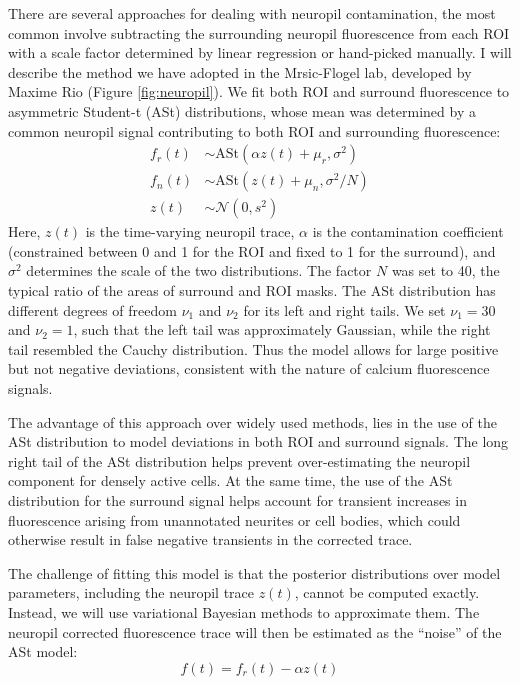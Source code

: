 \documentclass[a4paper]{report}
\begin{document}
There are several approaches for dealing with neuropil contamination, the most common involve subtracting the surrounding neuropil fluorescence from each ROI with a scale factor determined by linear regression or hand-picked manually. I will describe the method we have adopted in the Mrsic-Flogel lab, developed by Maxime Rio (Figure \ref{fig:neuropil}). 
We fit both ROI and surround fluorescence to asymmetric Student-t (ASt) distributions, whose mean was determined by a common neuropil signal contributing to both ROI and surrounding fluorescence:
\begin{align}
	f_r(t) &\sim \mathrm{ASt}(\alpha z(t) + \mu_r, \sigma^2) \\
	f_n(t) &\sim \mathrm{ASt}(z(t) + \mu_n, \sigma^2 / N) \label{eq:ast_n}\\
	z(t) &\sim \mathcal{N}(0, s^2)
\end{align}
Here, $z(t)$ is the time-varying neuropil trace, $\alpha$ is the contamination coefficient (constrained between 0 and 1 for the ROI and fixed to 1 for the surround), and $\sigma^2$ determines the scale of the two distributions. 
The factor $N$ was set to 40, the typical ratio of the areas of surround and ROI masks. 
The ASt distribution has different degrees of freedom $\nu_1$ and $\nu_2$ for its left and right tails. 
We set $\nu_1=30$ and $\nu_2=1$, such that the left tail was approximately Gaussian, while the right tail resembled the Cauchy distribution. 
Thus the model allows for large positive but not negative deviations, consistent with the nature of calcium fluorescence signals.

The advantage of this approach over widely used methods, lies in the use of the ASt distribution to model deviations in both ROI and surround signals. 
The long right tail of the ASt distribution helps prevent over-estimating the neuropil component for densely active cells. 
At the same time, the use of the ASt distribution for the surround signal helps account for transient increases in fluorescence arising from unannotated neurites or cell bodies, which could otherwise result in false negative transients in the corrected trace.

The challenge of fitting this model is that the posterior distributions over model parameters, including the neuropil trace $z(t)$, cannot be computed exactly. 
Instead, we will use variational Bayesian methods to approximate them. The neuropil corrected fluorescence trace will then be estimated as the ``noise'' of the ASt model:
\begin{equation}
	f(t) = f_r(t)- \alpha z(t)
\end{equation}
\end{document}
